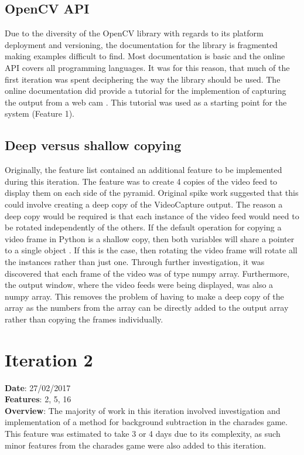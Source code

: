 \subsection{OpenCV API}
Due to the diversity of the OpenCV library with regards to its platform deployment and versioning, the documentation for the library is fragmented making examples difficult to find. Most documentation is basic and the online API covers all programming languages. It was for this reason, that much of the first iteration was spent deciphering the way the library should be used. The online documentation did provide a tutorial for the implemention of capturing the output from a web cam \cite{video_capture_tutorial}. This tutorial was used as a starting point for the system (Feature 1).

\subsection{Deep versus shallow copying}
Originally, the feature list contained an additional feature to be implemented during this iteration. The feature was to create 4 copies of the video feed to display them on each side of the pyramid. Original spike work suggested that this could involve creating a deep copy of the VideoCapture output. The reason a deep copy would be required is that each instance of the video feed would need to be rotated independently of the others. If the default operation for copying a video frame in Python is a shallow copy, then both variables will share a pointer to a single object \cite{deep_shallow_copying}. If this is the case, then rotating the video frame will rotate all the instances rather than just one. Through further investigation, it was discovered that each frame of the video was of type numpy array. Furthermore, the output window, where the video feeds were being displayed, was also a numpy array. This removes the problem of having to make a deep copy of the array as the numbers from the array can be directly added to the output array rather than copying the frames individually.

\newpage

\section{Iteration 2}
\textbf{Date}: 27/02/2017 \\
\textbf{Features}: 2, 5, 16 \\
\textbf{Overview}: The majority of work in this iteration involved investigation and implementation of a method for background subtraction in the charades game. This feature was estimated to take 3 or 4 days due to its complexity, as such minor features from the charades game were also added to this iteration.

